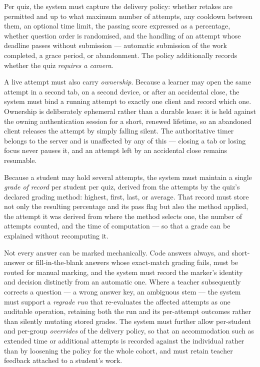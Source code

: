 Per quiz, the system must capture the delivery policy: whether retakes
are permitted and up to what maximum number of attempts, any cooldown
between them, an optional time limit, the passing score expressed as a
percentage, whether question order is randomised, and the handling of
an attempt whose deadline passes without submission — automatic
submission of the work completed, a grace period, or abandonment. The
policy additionally records whether the quiz \textit{requires a
camera}.

A live attempt must also carry \textit{ownership}. Because a learner
may open the same attempt in a second tab, on a second device, or
after an accidental close, the system must bind a running attempt to
exactly one client and record which one. Ownership is deliberately
ephemeral rather than a durable lease: it is held against the owning
authentication session for a short, renewed lifetime, so an
abandoned client releases the attempt by simply falling silent. The
authoritative timer belongs to the server and is unaffected by any of
this — closing a tab or losing focus never pauses it, and an attempt
left by an accidental close remains resumable.

Because a student may hold several attempts, the system must maintain
a single \textit{grade of record} per student per quiz, derived from
the attempts by the quiz's declared grading method: highest, first,
last, or average. That record must store not only the resulting
percentage and its pass flag but also the method applied, the attempt
it was derived from where the method selects one, the number of
attempts counted, and the time of computation — so that a grade can be
explained without recomputing it.

Not every answer can be marked mechanically. Code answers always, and
short-answer or fill-in-the-blank answers whose exact-match grading
fails, must be routed for manual marking, and the system must record
the marker's identity and decision distinctly from an automatic one.
Where a teacher subsequently corrects a question — a wrong answer key,
an ambiguous stem — the system must support a \textit{regrade run}
that re-evaluates the affected attempts as one auditable operation,
retaining both the run and its per-attempt outcomes rather than
silently mutating stored grades. The system must further allow
per-student and per-group \textit{overrides} of the delivery policy,
so that an accommodation such as extended time or additional attempts
is recorded against the individual rather than by loosening the policy
for the whole cohort, and must retain teacher feedback attached to a
student's work.

